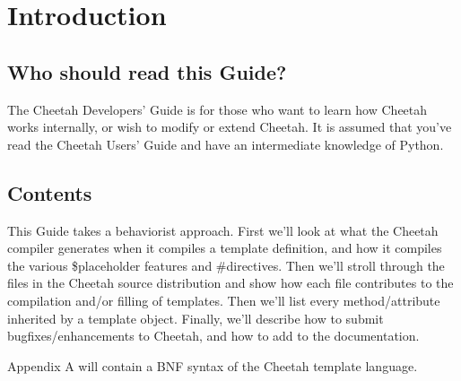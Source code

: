 \section{Introduction}

\subsection{Who should read this Guide?}

The Cheetah Developers' Guide is for those who want to learn how Cheetah works
internally, or wish to modify or extend Cheetah.  It is assumed that
you've read the Cheetah Users' Guide and have an intermediate knowledge of
Python.

\subsection{Contents}

This Guide takes a behaviorist approach.  First we'll look at what the
Cheetah compiler generates when it compiles a template definition, and
how it compiles the various \$placeholder features and \#directives.
Then we'll stroll through the files in the Cheetah source distribution
and show how each file contributes to the compilation and/or filling of
templates.  Then we'll list every method/attribute inherited by a template
object.  Finally, we'll describe how to submit bugfixes/enhancements to
Cheetah, and how to add to the documentation.

Appendix A will contain a BNF syntax of the Cheetah template language.



